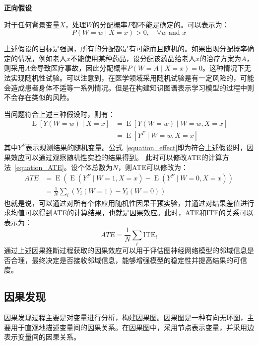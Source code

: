 \documentclass[algorithmlist, AutoFakeBold, AutoFakeSlant, figurelist, tablelist, nomlist, masters]{seuthesix}
\begin{document}
\begin{assumption}
  \textbf{正向假设}

  对于任何背景变量$X$，处理$W$的分配概率$P$都不能是确定的。可以表示为：
  \begin{equation}
    P(W=w \mid X=x)>0, \quad \forall w \text { and } x
  \end{equation}
\end{assumption}
上述假设的目标是强调，所有的分配都是有可能而且随机的。如果出现分配概率确定的情况，例如老人$x$不能使用某种药品，设分配该药品给老人$x$的治疗方案为$A$，则采用$A$会导致医疗事故，因此分配概率$P(W=A \mid X=x) = 0$。这种情况下无法实现随机性试验。可以注意到，在医学领域采用随机试验是有一定风险的，可能会造成患者身体不适等一系列情况。但是在构建知识图谱表示学习模型的过程中则不会存在类似的风险。

当问题符合上述三种假设时，则有：
\begin{equation}
  \begin{aligned}
  \operatorname{E}[Y(W=w) \mid X=x] & =\operatorname{E}[Y(W=w) \mid W=w, X=x] \\
  & =\operatorname{E}\left[Y^F \mid W=w, X=x\right]
  \end{aligned}
  \label{equation_effect}
\end{equation}
其中$Y^F$表示观测结果的随机变量。公式~\ref{equation_effect}即为符合上述假设时，因果效应可以通过观察随机性实验的结果得到。
此时可以修改ATE的计算方法~\ref{equation_ATE}。设个体总数为$N$，则ATE可以修改为：
\begin{equation}
  \begin{aligned}
  ATE & =\operatorname{E}\left(\operatorname{E}\left(Y^F \mid W=1, X=x\right)-\operatorname{E}\left(Y^F \mid W=0, X=x\right)\right) \\
  & =\frac{1}{N} \sum_i\left(Y_i(W=1)-Y_i(W=0)\right)
  \end{aligned}
  \label{equation_newATE}
\end{equation}
也就是说，可以通过对所有个体应用随机性因果干预实验，并通过对结果差值进行求均值可以得到ATE的计算结果，也就是因果效应。此时，ATE和ITE的关系可以表示为：
\begin{equation}
  ATE = \frac{1}{N} \sum_i \mathrm{ITE}_i
  \label{equation_ATEandITE}
\end{equation}
通过上述因果推断过程获取的因果效应可以用于评估图神经网络模型的邻域信息是否合理，最终决定是否接收邻域信息，能够增强模型的稳定性并提高结果的可信度。

\subsection{因果发现}
因果发现过程主要是对变量进行分析，构建因果图。因果图是一种有向无环图，主要用于直观地描述变量间的因果关系。在因果图中，采用节点表示变量，并采用边表示变量间的因果关系。
\end{document}
